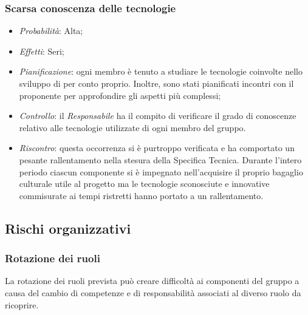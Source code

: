 		\subsubsection{Scarsa conoscenza delle tecnologie}
		
\begin{itemize}
\item \textit{Probabilità}: Alta;
\item \textit{Effetti}: Seri;
\item \textit{Pianificazione}: ogni membro è tenuto a studiare le tecnologie coinvolte nello sviluppo di \ProjectName{} per conto proprio. Inoltre, sono stati pianificati incontri con il proponente per approfondire gli aspetti più complessi;
\item \textit{Controllo}: il \textit{Responsabile} ha il compito di verificare il grado di conoscenze relativo alle tecnologie utilizzate di ogni membro del gruppo.
\item \textit{Riscontro}: questa occorrenza si è purtroppo verificata e ha comportato un pesante rallentamento nella stesura della Specifica Tecnica. Durante l'intero periodo ciascun componente si è impegnato nell'acquisire il proprio bagaglio culturale utile al progetto ma le tecnologie sconosciute e innovative commisurate ai tempi ristretti hanno portato a un rallentamento.
\end{itemize}	


	\subsection{Rischi organizzativi}
	
		\subsubsection{Rotazione dei ruoli}

La rotazione dei ruoli prevista può creare difficoltà ai componenti del gruppo a causa del cambio di competenze e di responsabilità associati al diverso ruolo da ricoprire.

